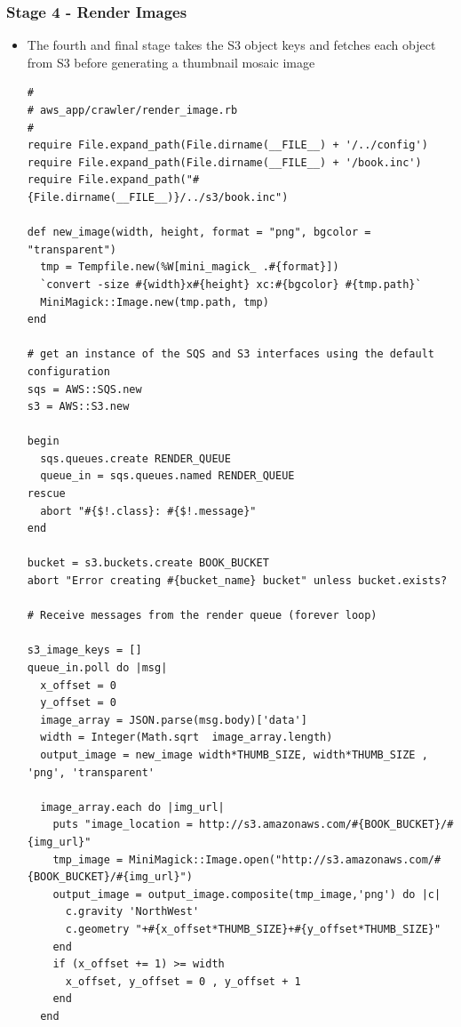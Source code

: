 \documentclass{beamer}
\begin{document}
\begin{frame}
\frametitle{Stage 4 - Render Images}
\begin{itemize}
\item The fourth and final stage takes the S3 object keys and fetches each object from S3
before generating a thumbnail mosaic image

\lstset{language=Ruby, style=eclipse}
\begin{lstlisting}
#
# aws_app/crawler/render_image.rb
#
require File.expand_path(File.dirname(__FILE__) + '/../config')
require File.expand_path(File.dirname(__FILE__) + '/book.inc')
require File.expand_path("#{File.dirname(__FILE__)}/../s3/book.inc")

def new_image(width, height, format = "png", bgcolor = "transparent")
  tmp = Tempfile.new(%W[mini_magick_ .#{format}])
  `convert -size #{width}x#{height} xc:#{bgcolor} #{tmp.path}`
  MiniMagick::Image.new(tmp.path, tmp)
end

# get an instance of the SQS and S3 interfaces using the default configuration
sqs = AWS::SQS.new
s3 = AWS::S3.new

begin
  sqs.queues.create RENDER_QUEUE
  queue_in = sqs.queues.named RENDER_QUEUE
rescue
  abort "#{$!.class}: #{$!.message}"
end

bucket = s3.buckets.create BOOK_BUCKET
abort "Error creating #{bucket_name} bucket" unless bucket.exists?

# Receive messages from the render queue (forever loop)

s3_image_keys = []
queue_in.poll do |msg|
  x_offset = 0
  y_offset = 0
  image_array = JSON.parse(msg.body)['data']
  width = Integer(Math.sqrt  image_array.length)
  output_image = new_image width*THUMB_SIZE, width*THUMB_SIZE , 'png', 'transparent'

  image_array.each do |img_url|
    puts "image_location = http://s3.amazonaws.com/#{BOOK_BUCKET}/#{img_url}"
    tmp_image = MiniMagick::Image.open("http://s3.amazonaws.com/#{BOOK_BUCKET}/#{img_url}")
    output_image = output_image.composite(tmp_image,'png') do |c|
      c.gravity 'NorthWest'
      c.geometry "+#{x_offset*THUMB_SIZE}+#{y_offset*THUMB_SIZE}"
    end
    if (x_offset += 1) >= width
      x_offset, y_offset = 0 , y_offset + 1
    end
  end


\end{lstlisting}
\end{itemize}
\end{frame}
\end{document}
